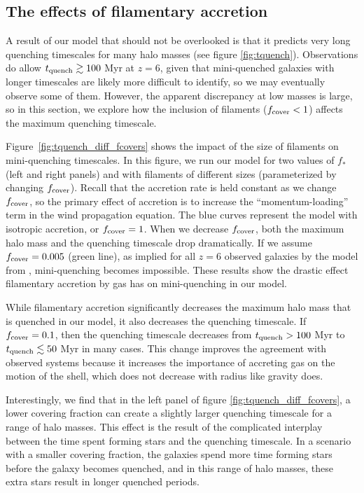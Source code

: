 \documentclass[a4paper,11pt]{article}
\begin{document}
\subsection{The effects of filamentary accretion} \label{sec:filaments}

A result of our model that should not be overlooked is that it predicts very long quenching timescales for many halo masses (see figure \ref{fig:tquench}). Observations do allow $t_{\rm quench} \gtrsim 100$ Myr at $z = 6$, given that mini-quenched galaxies with longer timescales are likely more difficult to identify, so we may eventually observe some of them. However, the apparent discrepancy at low masses is large, so in this section, we explore how the inclusion of filaments ($f_{\rm cover} < 1$) affects the maximum quenching timescale.

Figure~\ref{fig:tquench_diff_fcovers} shows the impact of the size of filaments on mini-quenching timescales. In this figure, we run our model for two values of $f_{*}$ (left and right panels) and with filaments of different sizes (parameterized by changing $f_{\rm cover}$). Recall that the accretion rate is held constant as we change $f_{\rm cover}$, so the primary effect of accretion is to increase the ``momentum-loading'' term in the wind propagation equation.  The blue curves represent the model with isotropic accretion, or $f_{\rm cover} = 1$. When we decrease $f_{\rm cover}$, both the maximum halo mass and the quenching timescale drop dramatically. If we assume $f_{\rm cover} = 0.005$ (green line), as implied for all $z = 6$ observed galaxies by the model from \cite{Mandelker2018}, mini-quenching becomes impossible. These results show the drastic effect filamentary accretion by gas has on mini-quenching in our model. 

While filamentary accretion significantly decreases the maximum halo mass that is quenched in our model, it also decreases the quenching timescale. If $f_{\rm cover} = 0.1$, then the quenching timescale decreases from $t_{\rm quench} > 100$ Myr to $t_{\rm quench} \lesssim 50$ Myr in many cases. This change improves the agreement with observed systems because it increases the importance of accreting gas on the motion of the shell, which does not decrease with radius like gravity does.

Interestingly, we find that in the left panel of figure \ref{fig:tquench_diff_fcovers}, a lower covering fraction can create a slightly larger quenching timescale for a range of halo masses. This effect is the result of the complicated interplay between the time spent forming stars and the quenching timescale. In a scenario with a smaller covering fraction, the galaxies spend more time forming stars before the galaxy becomes quenched, and in this range of halo masses, these extra stars result in longer quenched periods.
\end{document}
